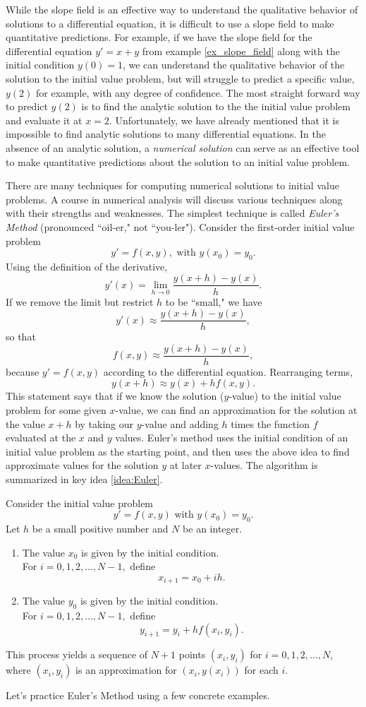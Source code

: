 While the slope field is an effective way to understand the qualitative behavior of solutions to a differential equation, it is difficult to use a slope field to make quantitative predictions.  For example, if we have the slope field for the differential equation $y' = x+y$ from example \ref{ex_slope_field} along with the initial condition $y(0)=1$, we can understand the qualitative behavior of the solution to the initial value problem, but will struggle to predict a specific value, $y(2)$ for example, with any degree of confidence. The most straight forward way to predict $y(2)$ is to find the analytic solution to the the initial value problem and evaluate it at $x=2$.  Unfortunately, we have already mentioned that it is impossible to find analytic solutions to many differential equations.  In the absence of an analytic solution, a \emph{numerical solution} can serve as an effective tool to make quantitative predictions about the solution to an initial value problem.

There are many techniques for computing numerical solutions to initial value problems. A course in numerical analysis will discuss various techniques along with their strengths and weaknesses. The simplest technique is called \emph{Euler's Method} (pronounced ``oil-er," not ``you-ler"). Consider the first-order initial value problem
\[y' = f(x,y), \text{ with } y(x_0) = y_0.\]
Using the definition of the derivative,
\[y'(x) = \lim_{h \to 0} \frac{y(x+h) - y(x)}{h}.\]
If we remove the limit but restrict $h$ to be ``small," we have
\[y'(x) \approx \frac{y(x+h) - y(x)}{h},\]
so that
\[f(x,y) \approx \frac{y(x+h)-y(x)}{h},\]
because $y' = f(x,y)$ according to the differential equation.  Rearranging terms,
\[y(x + h) \approx y(x) + hf(x,y).\]
This statement says that if we know the solution ($y$-value) to the initial value problem for some given $x$-value, we can find an approximation for the solution at the value $x+h$ by taking our  $y$-value and adding $h$ times the function $f$ evaluated at the $x$ and $y$ values. Euler's method uses the initial condition of an initial value problem as the starting point, and then uses the above idea to find approximate values for the solution $y$ at later $x$-values.  The algorithm is summarized in key idea \ref{idea:Euler}.


{Consider the initial value problem
\[
y' = f(x,y) \text{ with } y(x_0)=y_0.
\]
Let $h$ be a small positive number and $N$ be an integer.
\begin{enumerate}
\item The value $x_0$ is given by the initial condition.\\
For $i = 0, 1, 2, \ldots, N-1,$ define
\[x_{i+1} = x_0 + ih.\]
\item  The value $y_0$ is given by the initial condition.\\
For $i = 0, 1, 2, \ldots, N-1,$ define
\[y_{i+1} = y_i + hf(x_i,y_i).\]
\end{enumerate}
This process yields a sequence of $N+1$ points $(x_i,y_i)$ for $i= 0,1,2,\ldots,N$, where $(x_i, y_i)$ is an approximation for $(x_i,y(x_i))$ for each $i$.
}
Let's practice Euler's Method using a few concrete examples.\\

